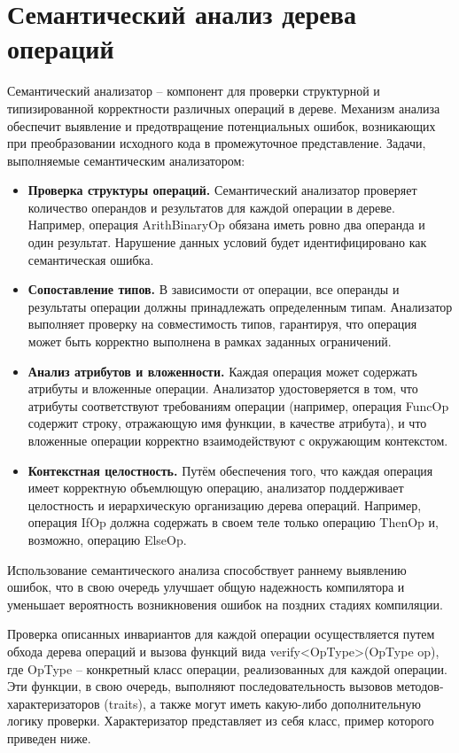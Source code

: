 \newpage
\section{Семантический анализ дерева операций}
\label{sec:semantizer}

Семантический анализатор -- компонент для проверки структурной и типизированной корректности различных операций в дереве.
Механизм анализа обеспечит выявление и предотвращение потенциальных ошибок, возникающих при преобразовании исходного кода в промежуточное представление.
Задачи, выполняемые семантическим анализатором:

\begin{itemize}
    \item \textbf{Проверка структуры операций.} Семантический анализатор проверяет количество операндов и результатов для каждой операции в дереве. Например, операция ArithBinaryOp обязана иметь ровно два операнда и один результат. Нарушение данных условий будет идентифицировано как семантическая ошибка.
    \item \textbf{Сопоставление типов.} В зависимости от операции, все операнды и результаты операции должны принадлежать определенным типам. Анализатор выполняет проверку на совместимость типов, гарантируя, что операция может быть корректно выполнена в рамках заданных ограничений.
    \item \textbf{Анализ атрибутов и вложенности.} Каждая операция может содержать атрибуты и вложенные операции. Анализатор удостоверяется в том, что атрибуты соответствуют требованиям операции (например, операция FuncOp содержит строку, отражающую имя функции, в качестве атрибута), и что вложенные операции корректно взаимодействуют с окружающим контекстом.
    \item \textbf{Контекстная целостность.} Путём обеспечения того, что каждая операция имеет корректную объемлющую операцию, анализатор поддерживает целостность и иерархическую организацию дерева операций. Например, операция IfOp должна содержать в своем теле только операцию ThenOp и, возможно, операцию ElseOp.
\end{itemize}

Использование семантического анализа способствует раннему выявлению ошибок, что в свою очередь улучшает общую надежность компилятора и уменьшает вероятность возникновения ошибок на поздних стадиях компиляции.

Проверка описанных инвариантов для каждой операции осуществляется путем обхода дерева операций и вызова функций вида verify<OpType>(OpType op), где OpType -- конкретный класс операции, реализованных для каждой операции. Эти функции, в свою очередь, выполняют последовательность вызовов методов-характеризаторов (traits), а также могут иметь какую-либо дополнительную логику проверки. Характеризатор представляет из себя класс, пример которого приведен ниже.

